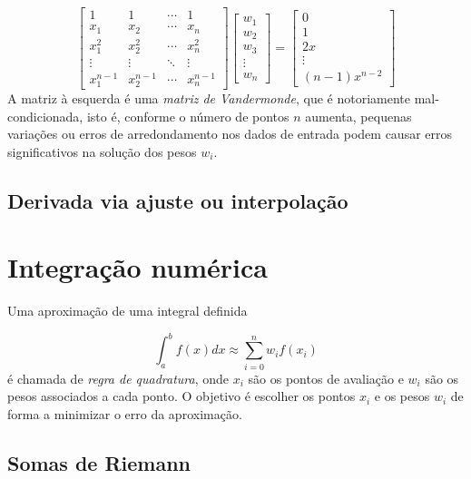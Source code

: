 \documentclass{article}
\begin{document}
\begin{equation}
    \begin{bmatrix}
        1 & 1 & \cdots & 1 \\
        x_1 & x_2 & \cdots & x_n \\
        x_1^2 & x_2^2 & \cdots & x_n^2 \\
        \vdots & \vdots & \ddots & \vdots \\
        x_1^{n-1} & x_2^{n-1} & \cdots & x_n^{n-1}
    \end{bmatrix}
    \begin{bmatrix}
        w_1 \\ w_2 \\ w_3 \\ \vdots \\ w_n
    \end{bmatrix}
    =
    \begin{bmatrix}
        0 \\ 1 \\ 2x \\ \vdots \\ (n-1)x^{n-2}
    \end{bmatrix}
\end{equation}
A matriz à esquerda é uma \emph{matriz de Vandermonde}, que é notoriamente mal-condicionada, isto é, conforme o número de pontos \(n\) aumenta, pequenas variações ou erros de arredondamento nos dados de entrada podem causar erros significativos na solução dos pesos \(w_i\).

\subsection{Derivada via ajuste ou interpolação}

\section{Integração numérica}

Uma aproximação de uma integral definida

\begin{equation}
    \int_{a}^{b} f(x) dx \approx \sum_{i=0}^{n} w_i f(x_i)
\end{equation}
é chamada de \emph{regra de quadratura}, onde \(x_i\) são os pontos de avaliação e \(w_i\) são os pesos associados a cada ponto. O objetivo é escolher os pontos \(x_i\) e os pesos \(w_i\) de forma a minimizar o erro da aproximação.

\subsection{Somas de Riemann}
\end{document}
